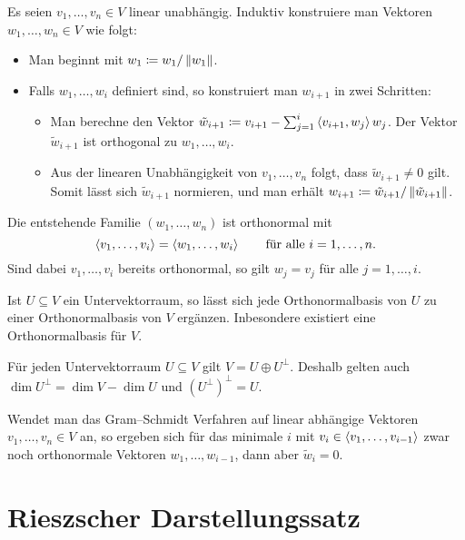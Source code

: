 Es seien $v_1, \dotsc, v_n \in V$ linear unabhängig.
Induktiv konstruiere man Vektoren $w_1, \dotsc, w_n \in V$ wie folgt:
\begin{itemize}
  \item
    Man beginnt mit $w_1 \coloneqq w_1 / \left\| w_1 \right\|$.
  \item
    Falls $w_1, \dotsc, w_i$ definiert sind, so konstruiert man $w_{i+1}$ in zwei Schritten:
    \begin{itemize}
      \item
        Man berechne den Vektor $\tilde{w}_{i+1} \coloneqq v_{i+1} - \sum_{j=1}^i \left\langle v_{i+1}, w_j \right\rangle w_j$.
        Der Vektor $\tilde{w}_{i+1}$ ist orthogonal zu $w_1, \dotsc, w_i$.
      \item
        Aus der linearen Unabhängigkeit von $v_1, \dotsc, v_n$ folgt, dass $\tilde{w}_{i+1} \neq 0$ gilt.
        Somit lässt sich $\tilde{w}_{i+1}$ normieren, und man erhält $w_{i+1} \coloneqq \tilde{w}_{i+1} / \left\| \tilde{w}_{i+1} \right\|$.
    \end{itemize}
\end{itemize}
Die entstehende Familie $(w_1, \dotsc, w_n)$ ist orthonormal mit
\[
    \left\langle v_1, \dotsc, v_i \right\rangle
  = \left\langle w_1, \dotsc, w_i \right\rangle
  \qquad
  \text{für alle $i = 1, \dotsc, n$}.
\]
Sind dabei $v_1, \dotsc, v_i$ bereits orthonormal, so gilt $w_j = v_j$ für alle $j = 1, \dotsc, i$.

\begin{theorem}
  Ist $U \subseteq V$ ein Untervektorraum, so lässt sich jede Orthonormalbasis von $U$ zu einer Orthonormalbasis von $V$ ergänzen.
  Inbesondere existiert eine Orthonormalbasis für $V$.
\end{theorem}

\begin{corollary}
  Für jeden Untervektorraum $U \subseteq V$ gilt $V = U \oplus U^\perp$.
  Deshalb gelten auch $\dim U^\perp = \dim V - \dim U$ und $(U^\perp)^\perp = U$.
\end{corollary}

\begin{remark}
  Wendet man das Gram--Schmidt Verfahren auf linear abhängige Vektoren $v_1, \dotsc, v_n \in V$ an, so ergeben sich für das minimale $i$ mit $v_i \in \left\langle v_1, \dotsc, v_{i-1} \right\rangle$ zwar noch orthonormale Vektoren $w_1, \dotsc, w_{i-1}$, dann aber $\tilde{w}_i = 0$.
\end{remark}





\section{Rieszscher Darstellungssatz}

